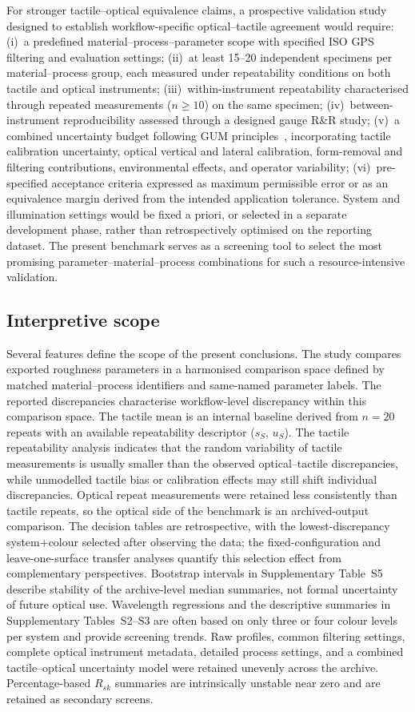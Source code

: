\documentclass{article}
\begin{document}
For stronger tactile--optical equivalence claims, a prospective validation study designed to establish workflow-specific optical--tactile agreement would require: (i)~a predefined material--process--parameter scope with specified ISO GPS filtering and evaluation settings; (ii)~at least 15--20 independent specimens per material--process group, each measured under repeatability conditions on both tactile and optical instruments; (iii)~within-instrument repeatability characterised through repeated measurements ($n \geq 10$) on the same specimen; (iv)~between-instrument reproducibility assessed through a designed gauge R\&R study; (v)~a combined uncertainty budget following GUM principles~\cite{JCGM100-2008}, incorporating tactile calibration uncertainty, optical vertical and lateral calibration, form-removal and filtering contributions, environmental effects, and operator variability; (vi)~pre-specified acceptance criteria expressed as maximum permissible error or as an equivalence margin derived from the intended application tolerance. System and illumination settings would be fixed a priori, or selected in a separate development phase, rather than retrospectively optimised on the reporting dataset. The present benchmark serves as a screening tool to select the most promising parameter--material--process combinations for such a resource-intensive validation.

\subsection{Interpretive scope}
Several features define the scope of the present conclusions. The study compares exported roughness parameters in a harmonised comparison space defined by matched material--process identifiers and same-named parameter labels. The reported discrepancies characterise workflow-level discrepancy within this comparison space. The tactile mean is an internal baseline derived from $n=20$ repeats with an available repeatability descriptor ($s_S$, $u_S$). The tactile repeatability analysis indicates that the random variability of tactile measurements is usually smaller than the observed optical--tactile discrepancies, while unmodelled tactile bias or calibration effects may still shift individual discrepancies. Optical repeat measurements were retained less consistently than tactile repeats, so the optical side of the benchmark is an archived-output comparison. The decision tables are retrospective, with the lowest-discrepancy system+colour selected after observing the data; the fixed-configuration and leave-one-surface transfer analyses quantify this selection effect from complementary perspectives. Bootstrap intervals in Supplementary Table~S5 describe stability of the archive-level median summaries, not formal uncertainty of future optical use. Wavelength regressions and the descriptive summaries in Supplementary Tables~S2--S3 are often based on only three or four colour levels per system and provide screening trends. Raw profiles, common filtering settings, complete optical instrument metadata, detailed process settings, and a combined tactile--optical uncertainty model were retained unevenly across the archive. Percentage-based $R_{sk}$ summaries are intrinsically unstable near zero and are retained as secondary screens.
\end{document}
